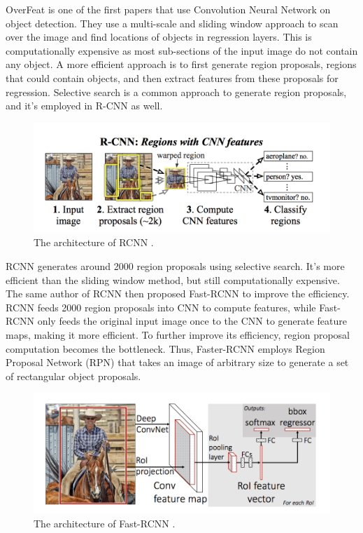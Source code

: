 OverFeat \citep{overfeat2014} is one of the first papers that use Convolution Neural Network on object detection. They use a multi-scale and sliding window approach to scan over the image and find locations of objects in regression layers. This is computationally expensive as most sub-sections of the input image do not contain any object. A more efficient approach is to first generate region proposals, regions that could contain objects, and then extract features from these proposals for regression. Selective search \citep{uijlings2013selective} is a common approach to generate region proposals, and it's employed in R-CNN \citep{girshick2014rich} as well. 

\begin{figure}[H]
\centering
\includegraphics[scale=0.45]{figures/chapter_detection/rcnn.png}
\caption{The architecture of RCNN \citep{girshick2014rich}.}
\label{fig.rcnn}
\end{figure}

RCNN generates around 2000 region proposals using selective search. It's more efficient than the sliding window method, but still computationally expensive. The same author of RCNN then proposed Fast-RCNN \citep{girshick2015fast} to improve the efficiency. RCNN feeds 2000 region proposals into CNN to compute features, while Fast-RCNN only feeds the original input image once to the CNN to generate feature maps, making it more efficient. To further improve its efficiency, region proposal computation becomes the bottleneck. Thus, Faster-RCNN \citep{ren2015faster} employs Region Proposal Network (RPN) that takes an image of arbitrary size to generate a set of rectangular object proposals.

\begin{figure}[H]
\centering
\includegraphics[scale=0.4]{figures/chapter_detection/fast-rcnn.png}
\caption{The architecture of Fast-RCNN \citep{girshick2015fast}.}
\label{fig.fastrcnn}
\end{figure}

